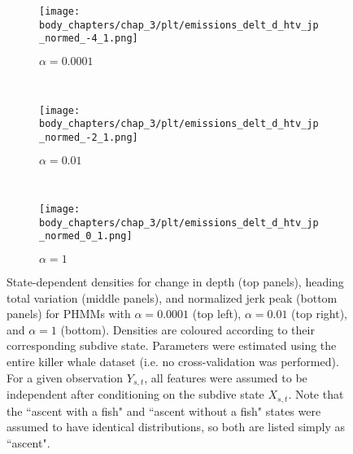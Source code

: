 \begin{figure}
    \centering
    \begin{subfigure}[t]{0.45\textwidth}
        \centering
        \texttt{[image: body\_chapters/chap\_3/plt/emissions\_delt\_d\_htv\_jp\_normed\_-4\_1.png]}
        \caption{$\alpha = 0.0001$}
    \end{subfigure}
    ~
    \begin{subfigure}[t]{0.45\textwidth}
        \centering
        \texttt{[image: body\_chapters/chap\_3/plt/emissions\_delt\_d\_htv\_jp\_normed\_-2\_1.png]}
        \caption{$\alpha = 0.01$}
    \end{subfigure}
    \\
    \begin{subfigure}[t]{0.9\textwidth}
        \centering
        \texttt{[image: body\_chapters/chap\_3/plt/emissions\_delt\_d\_htv\_jp\_normed\_0\_1.png]}
        \caption{$\alpha = 1$}
    \end{subfigure}
    \caption[State-dependent densities for change in depth, heading total variation, and normalized jerk peak for various PHMMs.]{State-dependent densities for change in depth (top panels), heading total variation (middle panels), and normalized jerk peak (bottom panels) for PHMMs with $\alpha = 0.0001$ (top left), $\alpha = 0.01$ (top right), and $\alpha = 1$ (bottom). Densities are coloured according to their corresponding subdive state. Parameters were estimated using the entire killer whale dataset (i.e. no cross-validation was performed). For a given observation $Y_{s,t}$, all features were assumed to be independent after conditioning on the subdive state $X_{s,t}$. Note that the ``ascent with a fish" and ``ascent without a fish" states were assumed to have identical distributions, so both are listed simply as ``ascent".}
    \label{fig:emissions}
\end{figure}



